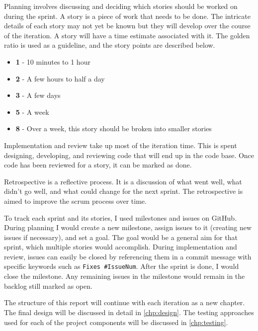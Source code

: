 Planning involves discussing and deciding which stories should be worked on during the sprint. A story is a piece of work that needs to be done. The intricate details of each story may not yet be known but they will develop over the course of the iteration. A story will have a time estimate associated with it. The golden ratio is used as a guideline, and the story points are described below.

\begin{itemize}
  \item \textbf{1} - 10 minutes to 1 hour
  \item \textbf{2} - A few hours to half a day
  \item \textbf{3} - A few days
  \item \textbf{5} - A week
  \item \textbf{8} - Over a week, this story should be broken into smaller stories
\end{itemize}

Implementation and review take up most of the iteration time. This is spent designing, developing, and reviewing code that will end up in the code base. Once code has been reviewed for a story, it can be marked as done. 

Retrospective is a reflective process. It is a discussion of what went well, what didn't go well, and what could change for the next sprint. The retrospective is aimed to improve the scrum process over time.

To track each sprint and its stories, I used milestones and issues on GitHub\cite{GitHubMilestones}. During planning I would create a new milestone, assign issues to it (creating new issues if necessary), and set a goal. The goal would be a general aim for that sprint, which multiple stories would accomplish. During implementation and review, issues can easily be closed by referencing them in a commit message with specific keywords such as \texttt{Fixes \#IssueNum}\cite{GitHubCloseIssueCommit}. After the sprint is done, I would close the milestone. Any remaining issues in the milestone would remain in the backlog still marked as open.

The structure of this report will continue with each iteration as a new chapter. The final design will be discussed in detail in \autoref{chp:design}. The testing approaches used for each of the project components will be discussed in \autoref{chp:testing}. 
